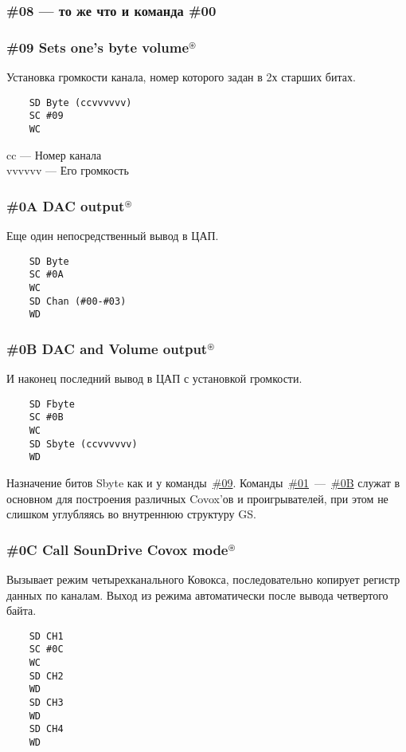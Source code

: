 \documentclass[a4paper,11pt]{article}
\DeclareRobustCommand{\Cyrax}{\texorpdfstring{\(^\circledast\)}{\circledast}}
\begin{document}
\subsubsection{\#08 --- то же что и команда \#00}

\subsubsection{\#09 Sets one's byte volume\Cyrax\label{cmd:09}}
Установка громкости канала, номер которого задан в 2х старших битах.
\begin{verbatim}
    SD Byte (ccvvvvvv)
    SC #09
    WC
\end{verbatim}

cc --- Номер канала\\
vvvvvv --- Его громкость

\subsubsection{\#0A DAC output\Cyrax}
Еще один непосредственный вывод в ЦАП.
\begin{verbatim}
    SD Byte
    SC #0A
    WC
    SD Chan (#00-#03)
    WD
\end{verbatim}

\subsubsection{\#0B DAC and Volume output\Cyrax\label{cmd:0B}}
И наконец последний вывод в ЦАП с установкой громкости.
\begin{verbatim}
    SD Fbyte
    SC #0B
    WC
    SD Sbyte (ccvvvvvv)
    WD
\end{verbatim}

Назначение битов Sbyte как и у команды~\hyperref[cmd:09]{\#09}.
Команды~\hyperref[cmd:01]{\#01}~---~\hyperref[cmd:0B]{\#0B} служат в основном для построения различных Covox'ов и проигрывателей, при этом не слишком углубляясь во внутреннюю структуру GS.

\subsubsection{\#0C Call SounDrive Covox mode\Cyrax}
Вызывает режим четырехканального Ковокса, последовательно копирует регистр данных по каналам. Выход из режима автоматически после вывода четвертого байта.
\begin{verbatim}
    SD CH1
    SC #0C
    WC
    SD CH2
    WD
    SD CH3
    WD
    SD CH4
    WD
\end{verbatim}
\end{document}

